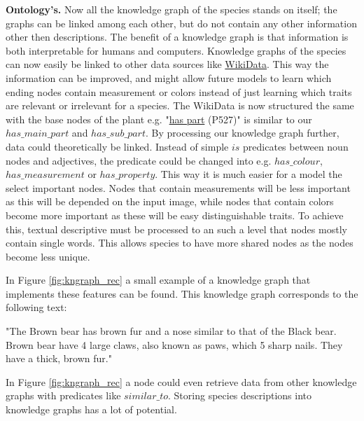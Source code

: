 \documentclass[a4paper, 12pt, oneside]{book} %
\begin{document}
\noindent
\newline
\textbf{Ontology's.}
Now all the knowledge graph of the species stands on itself; the graphs can be linked among each other, but do not contain any other information other then descriptions.
The benefit of a knowledge graph is that information is both interpretable for humans and computers.
Knowledge graphs of the species can now easily be linked to other data sources like \href{https://www.wikidata.org/wiki/Wikidata:Main_Page}{WikiData}.
This way the information can be improved, and might allow future models to learn which ending nodes contain measurement or colors instead of just learning which traits are relevant or irrelevant for a species.
The WikiData is now structured the same with the base nodes of the plant e.g. "\href{https://www.wikidata.org/wiki/Property:P527}{has part} (P527)"  is similar to our $has\_main\_part$ and $has\_sub\_part$.
By processing our knowledge graph further, data could theoretically be linked.
Instead of simple $is$ predicates between noun nodes and adjectives, the predicate could be changed into e.g. $has\_colour$, $has\_measurement$ or $has\_property$.
This way it is much easier for a model the select important nodes.
Nodes that contain measurements will be less important as this will be depended on the input image, while nodes that contain colors become more important as these will be easy distinguishable traits.
To achieve this, textual descriptive must be processed to an such a level that nodes mostly contain single words.
This allows species to have more shared nodes as the nodes become less unique.

In Figure \ref{fig:kngraph_rec} a small example of a knowledge graph that implements these features can be found.
This knowledge graph corresponds to the following text:
\newline

\noindent
"The Brown bear has brown fur and a nose similar to that of the Black bear. Brown bear have 4 large claws, also known as paws, which 5 sharp nails. They have a thick, brown fur."
\newline

\noindent
In Figure \ref{fig:kngraph_rec} a node could even retrieve data from other knowledge graphs with predicates like $similar\_to$.
Storing species descriptions into knowledge graphs has a lot of potential.
\end{document}
